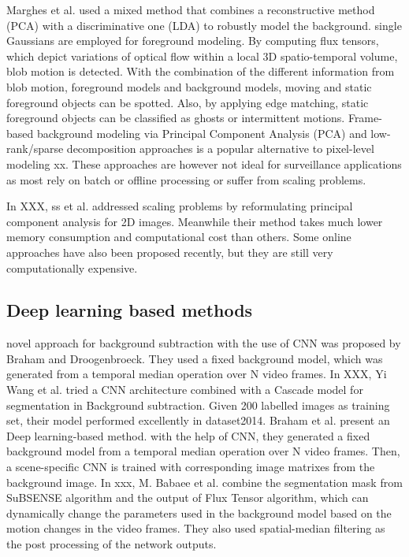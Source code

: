 \documentclass[journal]{IEEEtran}
\begin{document}
Marghes et al. 
used a mixed method that combines a reconstructive method (PCA) with a discriminative one (LDA) to robustly model the background.
single Gaussians are employed for foreground modeling. 
By computing flux tensors, which depict variations of optical flow within a local 3D spatio-temporal volume, blob motion is detected. 
With the combination of the different information from blob motion, foreground models and background models, moving and static foreground objects can be spotted. 
Also, by applying edge matching, static foreground objects can be classified as ghosts or intermittent motions.
Frame-based background modeling via Principal Component Analysis (PCA) and low-rank/sparse decomposition approaches is a popular alternative to pixel-level modeling xx. 
These approaches are however not ideal for surveillance applications as most rely on batch or offline processing or suffer from scaling problems. 

In XXX, ss et al. 
addressed scaling problems by reformulating principal component analysis for 2D images. 
Meanwhile their method takes much lower memory consumption and computational cost than others. 
Some online approaches have also been proposed recently, but they are still very computationally expensive.

\subsection{Deep learning based methods}
novel approach for background subtraction with the use of CNN was proposed by Braham and Droogenbroeck. 
They used a fixed background model, which was generated from a temporal median operation over N video frames.
In XXX, Yi Wang et al. 
tried a CNN architecture combined with a Cascade model for segmentation in Background subtraction. 
Given 200 labelled images as training set, their model performed excellently in dataset2014.
Braham et al. 
present an Deep learning-based method. 
with the help of CNN, they generated a fixed background model from a temporal median operation over N video frames. 
Then, a scene-specific CNN is trained with corresponding image matrixes from the background image.
In xxx, M. 
Babaee et al. 
combine the segmentation mask from SuBSENSE algorithm and the output of Flux Tensor algorithm, which can dynamically change the parameters used in the background model based on the motion changes in the video frames. 
They also used spatial-median filtering as the post processing of the network outputs.
\end{document}
